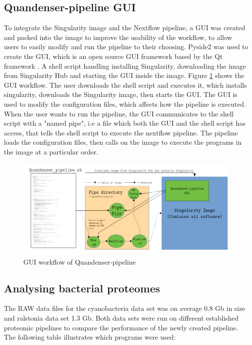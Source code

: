 \subsection{Quandenser-pipeline GUI}
To integrate the Singularity image and the Nextflow pipeline, a GUI was created and packed into the image to improve the usability of the workflow, to allow users to easily modify and run the pipeline to their choosing. Pyside2 was used to create the GUI, which is an open source GUI framework based by the Qt framework \cite{pyside2}. A shell script handling installing Singularity, downloading the image from Singularity Hub and starting the GUI inside the image. Figure \ref{fig:GUI_workflow} shows the GUI workflow. The user downloads the shell script and executes it, which installs singularity, downloads the Singularity image, then starts the GUI. The GUI is used to modify the configuration files, which affects how the pipeline is executed. When the user wants to run the pipeline, the GUI communicates to the shell script with a "named pipe", i.e a file which both the GUI and the shell script has access, that tells the shell script to execute the nextflow pipeline. The pipeline loads the configuration files, then calls on the image to execute the programs in the image at a particular order.

\begin{figure}[!htbp]
  \includegraphics[width=\linewidth]{pictures/GUI_workflow.png}
  \caption{GUI workflow of Quandenser-pipeline}
  \label{fig:GUI_workflow}
\end{figure}


\subsection{Analysing bacterial proteomes}
The RAW data files for the cyanobacteria data set was on average 0.8 Gb in size and ralstonia data set 1.3 Gb. Both data sets were run on different established proteomic pipelines to compare the performance of the newly created pipeline. The following table illustrates which programs were used:

